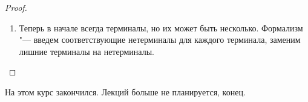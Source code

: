 \begin{proof}
\begin{enumerate}
\item
Теперь в начале всегда терминалы, но их может быть несколько.
Формализм "--- введем соответствующие нетерминалы для каждого терминала, заменим лишние терминалы на нетерминалы.     

\end{enumerate}
\end{proof}

На этом курс закончился. Лекций больше не планируется, конец.
